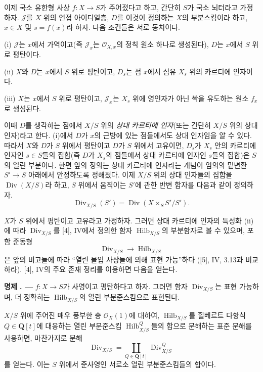 \documentclass[11pt,twoside,openany]{book}
\numberwithin{equation}{section}
\newcommand{\sourceunit}{front}
\newcommand{\src}[1]{%
  \phantomsection\hypertarget{src:\sourceunit:#1}{}%
  \marginpar{\raggedleft\footnotesize\sffamily #1}%
}
\theoremstyle{plain}
\theoremstyle{definition}
\theoremstyle{remark}
\newcommand{\result}[2]{%
  \par\medskip\noindent\textbf{#1%
  \if\relax\detokenize{#2}\relax\else\space#2\fi. ---}\enspace
}
\begin{document}
이제 국소 유한형 사상 $f:X\longrightarrow S$가 주어졌다고 하고, 간단히
$S$가 국소 뇌터라고 가정하자. $\mathcal J$를 $X$ 위의 연접 아이디얼층,
$D$를 이것이 정의하는 $X$의 부분스킴이라 하고, $x\in X$ 및 $s=f(x)$라
하자. 다음 조건들은 서로 동치이다.

\noindent (i) $\mathcal J$는 $x$에서 가역이고(즉 $\mathcal J_x$는
$\mathcal O_{X,x}$의 정칙 원소 하나로 생성된다), $D$는 $x$에서
$S$ 위로 평탄이다.

\noindent (ii) $X$와 $D$는 $x$에서 $S$ 위로 평탄이고, $D_s$는 점
$x$에서 섬유 $X_s$ 위의 카르티에 인자이다.

\noindent (iii) $X$는 $x$에서 $S$ 위로 평탄이고, $\mathcal J_x$는
$X_s$ 위에 영인자가 아닌 싹을 유도하는 원소 $f_x$로 생성된다.

이때 $D$를 생각하는 점에서 $X/S$ 위의 \emph{상대 카르티에 인자}(또는
간단히 $X/S$ 위의 상대 인자)라고 한다. (i)에서 $D$가 $x$의 근방에 있는
점들에서도 상대 인자임을 알 수 있다. 따라서 $X$와 $D$가 $S$ 위에서
평탄이고 $D$가 $S$ 위에서 고유이면, $D_s$가 $X_s$ 안의 카르티에
인자인 $s\in S$들의 집합(즉 $D$가 $X_s$의 점들에서 상대 카르티에
인자인 $s$들의 집합)은 $S$의 열린 부분이다. 한편 앞의 정의는 상대
카르티에 인자라는 개념이 임의의 밑변환 $S'\longrightarrow S$ 아래에서
안정하도록 정해졌다. 이제 $X/S$ 위의 상대 인자들의 집합을
$\operatorname{Div}(X/S)$라 하고, $S$ 위에서 움직이는 $S'$에 관한 반변
함자를 다음과 같이 정의하자.
\[
\operatorname{Div}_{X/S}(S')=
\operatorname{Div}(X\times_SS'/S').
\]

$X$가 $S$ 위에서 평탄이고 고유라고 가정하자. 그러면 상대 카르티에 인자의
특성화 (ii)에 따라 $\operatorname{Div}_{X/S}$를 [4], IV에서 정의한 함자
$\operatorname{Hilb}_{X/S}$의 부분함자로 볼 수 있으며, 포함 준동형
\[
\operatorname{Div}_{X/S}\longrightarrow\operatorname{Hilb}_{X/S}
\]
은 앞의 비고들에 따라 ``열린 몰입 사상들에 의해 표현 가능''하다
([5], IV, 3.13과 비교하라). [4], IV의 주요 존재 정리를 이용하면 다음을
얻는다.

\src{152}
\result{명제}{4.1} $f:X\longrightarrow S$가 사영이고 평탄하다고 하자.
그러면 함자 $\operatorname{Div}_{X/S}$는 표현 가능하며, 더 정확히는
$\operatorname{Hilb}_{X/S}$의 열린 부분준스킴으로 표현된다.

$X/S$ 위에 주어진 매우 풍부한 층 $\mathcal O_X(1)$에 대하여,
$\operatorname{Hilb}_{X/S}$를 힐베르트 다항식
$Q\in\mathbf Q[t]$에 대응하는 열린 부분준스킴
$\operatorname{Hilb}^{Q}_{X/S}$들의 합으로 분해하는 표준 분해를 사용하면,
마찬가지로 분해
\[
\operatorname{Div}_{X/S}=
\coprod_{Q\in\mathbf Q[t]}\operatorname{Div}^{Q}_{X/S}
\]
를 얻는다. 이는 $S$ 위에서 준사영인 서로소 열린 부분준스킴들의 합이다.
\end{document}
